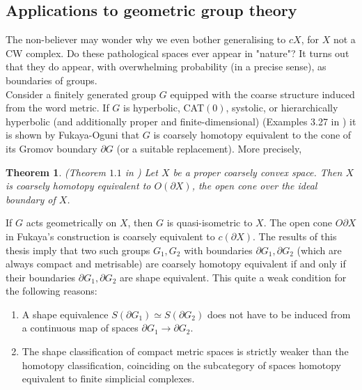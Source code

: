 \documentclass[a4paper,11pt]{article}
\theoremstyle{definition}
\theoremstyle{plain}
\newtheorem{theorem}[definition]{Theorem}
\theoremstyle{remark}
\begin{document}
\subsection{Applications to geometric group theory}

The non-believer may wonder why we even bother generalising to $cX$, for $X$ not a CW complex.  Do these pathological spaces ever appear in "nature"? It turns out that they do appear, with overwhelming probability (in a precise sense), as boundaries of groups.\\

Consider a finitely generated group $G$ equipped with the coarse structure induced from the word metric. If $G$ is hyperbolic, CAT$(0)$, systolic, or hierarchically hyperbolic (and additionally proper and finite-dimensional) (Examples 3.27 in \cite{engel2021coronasproperlycombablespaces}) it is shown by Fukaya-Oguni \cite{Fukaya_2018} that $G$ is coarsely homotopy equivalent to the cone of its Gromov boundary $\partial G$ (or a suitable replacement). More precisely, 

\begin{theorem} (Theorem $1.1$ in \cite{Fukaya_2018}) Let $X$ be a proper coarsely convex space. Then $X$ is coarsely homotopy equivalent to $O(\partial X)$, the open cone over the ideal boundary of $X$. 
\end{theorem}

If $G$ acts geometrically on $X$, then $G$ is quasi-isometric to $X$. The open cone $O\partial X$ in Fukaya's construction is coarsely equivalent to $c(\partial X)$. The results of this thesis imply that two such groups $G_{1},G_{2}$ with boundaries $\partial G_{1}, \partial G_{2}$ (which are always compact and metrisable) are coarsely homotopy equivalent if and only if their boundaries $\partial G_1, \partial G_2$ are shape equivalent. This quite a weak condition for the following reasons:

\begin{enumerate}
\item A shape equivalence $S(\partial G_{1})\simeq S(\partial G_{2})$ does not have to be induced from a continuous map of spaces $\partial G_{1}\rightarrow \partial G_{2}$. \cite{zdravkovska1981example}
\item The shape classification of compact metric spaces is strictly weaker than the homotopy classification, coinciding on the subcategory of spaces homotopy equivalent to finite simplicial complexes. 
\end{enumerate}
\end{document}
